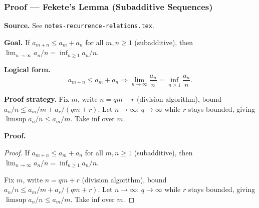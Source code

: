 

\clearpage
{}
\hypertarget{proof-RA-ABB-T-fekete-sub}{}

\subsubsection[Fekete's Lemma (Subadditive Sequences)]{Proof --- Fekete's Lemma (Subadditive Sequences)}

\bigskip

\noindent
\textbf{Source.} See \texttt{notes-recurrence-relations.tex}.

\vspace{0.75em}

\noindent
\textbf{Goal.} If $a_{m+n} \le a_m + a_n$ for all $m, n \ge 1$ (subadditive), then $\lim_{n\to\infty} a_n/n = \inf_{n\ge 1} a_n/n$.

\vspace{0.75em}

\noindent
\textbf{Logical form.}
\[
  a_{m+n} \le a_m + a_n \Rightarrow \lim_{n\to\infty} \frac{a_n}{n} = \inf_{n\ge 1} \frac{a_n}{n}.
\]

\vspace{0.75em}

\noindent
\textbf{Proof strategy.} Fix $m$, write $n = qm + r$ (division algorithm), bound $a_n/n \le a_m/m + a_r/(qm+r)$. Let $n \to \infty$: $q \to \infty$ while $r$ stays bounded, giving $\limsup a_n/n \le a_m/m$. Take inf over $m$.

\vspace{0.75em}

\noindent
\textbf{Proof.}
\begin{proof}
\Claim If $a_{m+n} \le a_m + a_n$ for all $m, n \ge 1$ (subadditive), then $\lim_{n\to\infty} a_n/n = \inf_{n\ge 1} a_n/n$.

\Given 

\Goal 

\Strategy Fix $m$, write $n = qm + r$ (division algorithm), bound $a_n/n \le a_m/m + a_r/(qm+r)$. Let $n \to \infty$: $q \to \infty$ while $r$ stays bounded, giving $\limsup a_n/n \le a_m/m$. Take inf over $m$.

\medskip


\end{proof}

